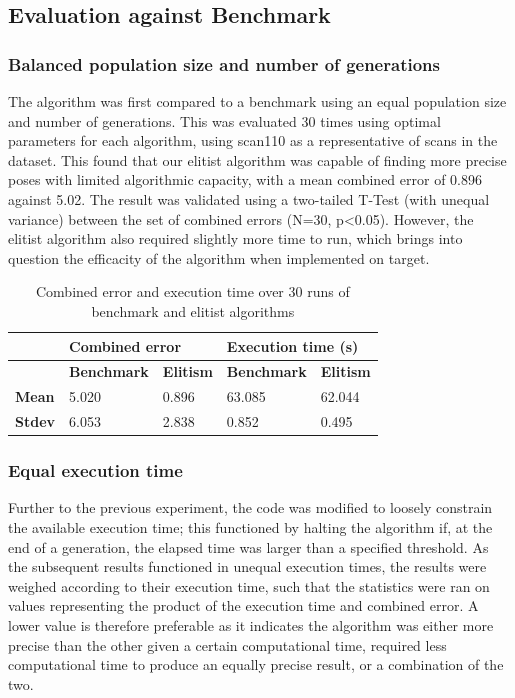 \documentclass[authoryearcitations]{UoYCSproject}
\begin{document}

\subsection{Evaluation against Benchmark}
\subsubsection{Balanced population size and number of generations}
\label{subsec:ga_vs_elite_eq_pop_gen}
The algorithm was first compared to a benchmark using an equal population size and number of generations. This was evaluated 30 times using optimal parameters for each algorithm, using scan110 as a representative of scans in the dataset. This found that our elitist algorithm was capable of finding more precise poses with limited algorithmic capacity, with a mean combined error of 0.896 against 5.02. The result was validated using a two-tailed T-Test (with unequal variance) between the set of combined errors (N=30, p<0.05). However, the elitist algorithm also required slightly more time to run, which brings into question the efficacity of the algorithm when implemented on target.

\begin{table}
\centering
\begin{tabular}{|l|l|l|l|l|}
\hline & \multicolumn{2}{l|}{\textbf{Combined error}} & \multicolumn{2}{l|}{\textbf{Execution time (s)}} \\ \hline & 
\textbf{Benchmark} & \textbf{Elitism}& \textbf{Benchmark}   & \textbf{Elitism}  \\ \hline 
\textbf{Mean} & 5.020   & 0.896  & 63.085 & 62.044  \\ \hline
\textbf{Stdev}  & 6.053   & 2.838& 0.852 & 0.495  \\ \hline
\end{tabular}
\caption{Combined error and execution time over 30 runs of benchmark and elitist algorithms}
\label{tab:ga_vs_elite_eq_pop_gen}
\end{table}

\subsubsection{Equal execution time}
\label{subsec:ga_vs_elite_time_sweep}
Further to the previous experiment, the code was modified to loosely constrain the available execution time; this functioned by halting the algorithm if, at the end of a generation, the elapsed time was larger than a specified threshold. As the subsequent results functioned in unequal execution times, the results were weighed according to their execution time, such that the statistics were ran on values representing the product of the execution time and combined error. A lower value is therefore preferable as it indicates the algorithm was either more precise than the other given a certain computational time, required less computational time to produce an equally precise result, or a combination of the two. 
\end{document}

